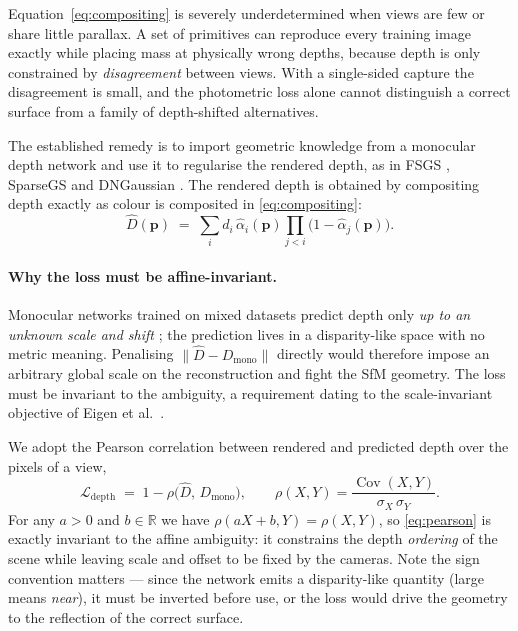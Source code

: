 Equation~\eqref{eq:compositing} is severely underdetermined when views are few or
share little parallax. A set of primitives can reproduce every training image
exactly while placing mass at physically wrong depths, because depth is only
constrained by \emph{disagreement} between views. With a single-sided capture the
disagreement is small, and the photometric loss alone cannot distinguish a correct
surface from a family of depth-shifted alternatives.

The established remedy is to import geometric knowledge from a monocular depth
network \cite{ranftl2022midas,yang2024depthanythingv2} and use it to regularise
the rendered depth, as in FSGS \cite{zhu2024fsgs}, SparseGS
\cite{xiong2024sparsegs} and DNGaussian \cite{li2024dngaussian}. The rendered
depth is obtained by compositing depth exactly as colour is composited in
\eqref{eq:compositing}:
\begin{equation}
  \hat{D}(\bm{p}) \;=\; \sum_i d_i\,\hat{\alpha}_i(\bm{p}) \prod_{j<i}\big(1-\hat{\alpha}_j(\bm{p})\big).
\end{equation}

\paragraph{Why the loss must be affine-invariant.}
Monocular networks trained on mixed datasets predict depth only \emph{up to an
unknown scale and shift} \cite{ranftl2022midas}; the prediction lives in a
disparity-like space with no metric meaning. Penalising
$\lVert \hat{D}-D_{\text{mono}}\rVert$ directly would therefore impose an
arbitrary global scale on the reconstruction and fight the SfM geometry. The loss
must be invariant to the ambiguity, a requirement dating to the scale-invariant
objective of Eigen et al.~\cite{eigen2014depth}.

We adopt the Pearson correlation \cite{pearson1895} between rendered and predicted
depth over the pixels of a view,
\begin{equation}
  \mathcal{L}_{\text{depth}} \;=\; 1-\rho\big(\hat{D},\,D_{\text{mono}}\big),
  \qquad
  \rho(X,Y)=\frac{\operatorname{Cov}(X,Y)}{\sigma_X\,\sigma_Y}.
  \label{eq:pearson}
\end{equation}
For any $a>0$ and $b\in\mathbb{R}$ we have $\rho(aX+b,Y)=\rho(X,Y)$, so
\eqref{eq:pearson} is exactly invariant to the affine ambiguity: it constrains the
depth \emph{ordering} of the scene while leaving scale and offset to be fixed by
the cameras. Note the sign convention matters --- since the network emits a
disparity-like quantity (large means \emph{near}), it must be inverted before use,
or the loss would drive the geometry to the reflection of the correct surface.

